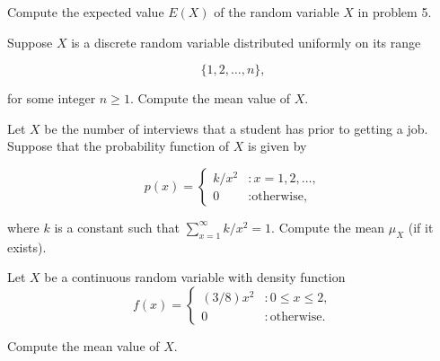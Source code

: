 \documentclass[12pt,reqno]{amsart}
\begin{document}
\bigskip
\prob Compute the expected value $E(X)$ of the random variable $X$ in problem 5.\vfill



























\bigskip
\prob Suppose $X$ is a discrete random variable distributed uniformly on its range
    
\[\{1,2,\ldots,n\},\]

for some integer $n\geq 1$. Compute the mean value of $X$.\vfill













\newpage
\prob Let $X$ be the number of interviews that a student has prior to getting a job. Suppose that the probability function of $X$ is given by

    \[p(x) = \begin{cases}
    k/x^2 & : x=1,2,\ldots, \\
    0 & : \text{otherwise,}
    \end{cases}\]

where $k$ is a constant such that $\sum_{x=1}^\infty k/x^2 = 1$. Compute the mean $\mu_X$ (if it exists).\vfill



















\bigskip
\prob Let $X$ be a continuous random variable with density function
    \[f(x) = \begin{cases}
        (3/8)x^2 & : 0 \leq x \leq 2, \\
        0 & : \text{otherwise}.
    \end{cases}\]

Compute the mean value of $X$.\vfill
\end{document}
